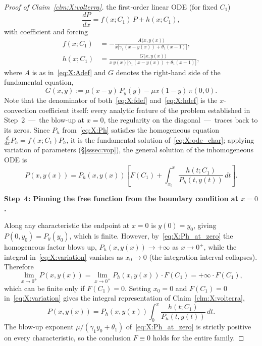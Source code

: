 \begin{proof}[Proof of Claim~\ref{clm:X:volterra}]
the first-order linear ODE (for fixed $C_1$)
\begin{equation}
    \frac{dP}{dx} = f(x;C_1)\,P + h(x;C_1),
    \label{eq:X:ode_char}
\end{equation}
with coefficient and forcing
\begin{align}
    f(x;C_1) &= -\frac{A\bigl(x,y(x)\bigr)}
                       {x\bigl[\gamma_1(x-y(x))+\theta_1(x-1)\bigr]},
    \label{eq:X:fdef}\\[4pt]
    h(x;C_1) &= \frac{G\bigl(x,y(x)\bigr)}
                     {x\,y(x)\bigl[\gamma_1(x-y(x))+\theta_1(x-1)\bigr]},
    \label{eq:X:hdef}
\end{align}
where $A$ is as in~\eqref{eq:X:Adef} and $G$ denotes the right-hand side of the
fundamental equation,
\begin{equation}
    G(x,y) := \mu(x-y)\,P_y(y) - \mu x(1-y)\,\pi(0,0).
    \label{eq:X:Gdef}
\end{equation}
Note that the denominator of both~\eqref{eq:X:fdef} and~\eqref{eq:X:hdef} is the
$x$-convection coefficient itself: every analytic feature of the problem established in
Step~2~---~the blow-up at $x=0$, the regularity on the diagonal~---~traces back to its
zeros. Since $P_h$ from~\eqref{eq:X:Ph} satisfies the homogeneous equation
$\frac{d}{dx}P_h=f(x;C_1)P_h$, it is the fundamental solution
of~\eqref{eq:X:ode_char}; applying variation of parameters (\S\ref{sssec:vop}), the
general solution of the inhomogeneous ODE is
\begin{equation}
    P(x,y(x)) = P_h(x,y(x))\!\left[F(C_1)
        + \int_{x_0}^{x} \frac{h(t;C_1)}{P_h(t,y(t))}\,dt\right].
    \label{eq:X:variation}
\end{equation}

\medskip\noindent\textbf{Step~4: Pinning the free function from the boundary condition at $x=0$.}

Along any characteristic the endpoint at $x=0$ is $y(0)=y_0$, giving
$P(0,y_0)=P_y(y_0)$, which is finite. However, by~\eqref{eq:X:Ph_at_zero} the homogeneous
factor blows up, $P_h(x,y(x))\to+\infty$ as $x\to0^+$, while the integral
in~\eqref{eq:X:variation} vanishes as $x_0\to0$ (the integration interval collapses).
Therefore
\[
    \lim_{x\to0^+}P(x,y(x))
    = \lim_{x\to0^+}P_h(x,y(x))\cdot F(C_1)
    = +\infty\cdot F(C_1),
\]
which can be finite only if $F(C_1)=0$. Setting $x_0=0$ and $F(C_1)=0$
in~\eqref{eq:X:variation} gives the integral representation of
Claim~\ref{clm:X:volterra},
\begin{equation}
    P(x,y(x)) = P_h(x,y(x))\int_{0}^{x} \frac{h(t;C_1)}{P_h(t,y(t))}\,dt.
    \label{eq:X:integral_rep_body}
\end{equation}
The blow-up exponent $\mu/(\gamma_1 y_0+\theta_1)$ of~\eqref{eq:X:Ph_at_zero} is
strictly positive on every characteristic, so the conclusion $F\equiv0$ holds for the
entire family.


\end{proof}
